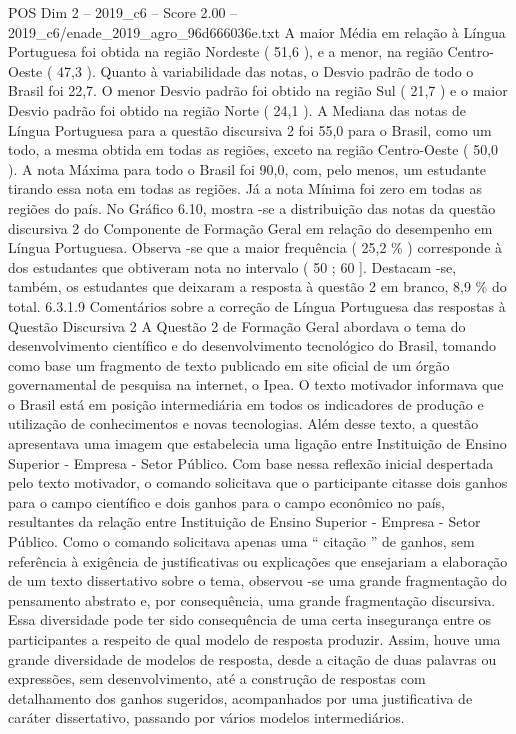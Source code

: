 \begin{textsample}{POS Dim 2 – 2019\_c6 – Score 2.00 – 2019\_c6/enade\_2019\_agro\_96d666036e.txt}
A maior Média em relação à Língua Portuguesa foi obtida na região Nordeste ( 51,6 ), e a menor, na região Centro-Oeste ( 47,3 ).
Quanto à variabilidade das notas, o Desvio padrão de todo o Brasil foi 22,7.
O menor Desvio padrão foi obtido na região Sul ( 21,7 ) e o maior Desvio padrão foi obtido na região Norte ( 24,1 ).
A Mediana das notas de Língua Portuguesa para a questão discursiva 2 foi 55,0 para o Brasil, como um todo, a mesma obtida em todas as regiões, exceto na região Centro-Oeste ( 50,0 ).
A nota Máxima para todo o Brasil foi 90,0, com, pelo menos, um estudante tirando essa nota em todas as regiões.
Já a nota Mínima foi zero em todas as regiões do país.
No Gráfico 6.10, mostra -se a distribuição das notas da questão discursiva 2 do Componente de Formação Geral em relação do desempenho em Língua Portuguesa.
Observa -se que a maior frequência ( 25,2 \% ) corresponde à dos estudantes que obtiveram nota no intervalo ( 50 ; 60 ].
Destacam -se, também, os estudantes que deixaram a resposta à questão 2 em branco, 8,9 \% do total. 6.3.1.9 Comentários sobre a correção de Língua Portuguesa das respostas à Questão Discursiva 2 A Questão 2 de Formação Geral abordava o tema do desenvolvimento científico e do desenvolvimento tecnológico do Brasil, tomando como base um fragmento de texto publicado em site oficial de um órgão governamental de pesquisa na internet, o Ipea.
O texto motivador informava que o Brasil está em posição intermediária em todos os indicadores de produção e utilização de conhecimentos e novas tecnologias.
Além desse texto, a questão apresentava uma imagem que estabelecia uma ligação entre Instituição de Ensino Superior - Empresa - Setor Público.
Com base nessa reflexão inicial despertada pelo texto motivador, o comando solicitava que o participante citasse dois ganhos para o campo científico e dois ganhos para o campo econômico no país, resultantes da relação entre Instituição de Ensino Superior - Empresa - Setor Público.
Como o comando solicitava apenas uma “ citação ” de ganhos, sem referência à exigência de justificativas ou explicações que ensejariam a elaboração de um texto dissertativo sobre o tema, observou -se uma grande fragmentação do pensamento abstrato e, por consequência, uma grande fragmentação discursiva.
Essa diversidade pode ter sido consequência de uma certa insegurança entre os participantes a respeito de qual modelo de resposta produzir.
Assim, houve uma grande diversidade de modelos de resposta, desde a citação de duas palavras ou expressões, sem desenvolvimento, até a construção de respostas com detalhamento dos ganhos sugeridos, acompanhados por uma justificativa de caráter dissertativo, passando por vários modelos intermediários.

\end{textsample}
